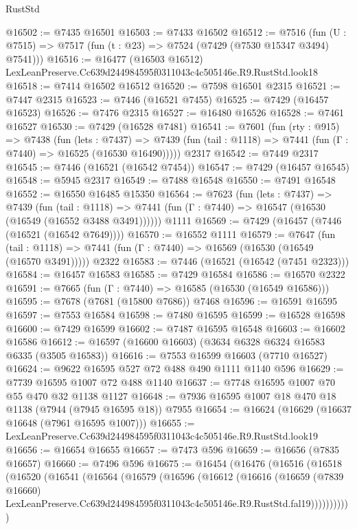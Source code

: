 \begin{lexlean}{RustStd}
\begin{coremodule}
@16502 := @7435 @16501
@16503 := @7433 @16502
@16512 := @7516
    (fun (U : @7515) => @7517 (fun (t : @23) => @7524 (@7429 (@7530 @15347 @3494) @7541)))
@16516 := @16477 (@16503 @16512) LexLeanPreserve.Cc639d244984595f0311043c4c505146e.R9.RustStd.look18
@16518 := @7414 @16502 @16512
@16520 := @7598 @16501 @2315
@16521 := @7447 @2315
@16523 := @7446 (@16521 @7455)
@16525 := @7429 (@16457 @16523)
@16526 := @7476 @2315
@16527 := @16480 @16526
@16528 := @7461 @16527
@16530 := @7429 (@16528 @7481)
@16541 := @7601
    (fun (rty : @915) =>
    @7438
      (fun (lets : @7437) =>
      @7439 (fun (tail : @1118) => @7441 (fun (Γ : @7440) => @16525 (@16530 @16490)))))
    @2317
@16542 := @7449 @2317
@16545 := @7446 (@16521 (@16542 @7454))
@16547 := @7429 (@16457 @16545)
@16548 := @5945 @2317
@16549 := @7488 @16548
@16550 := @7491 @16548
@16552 := @16550 @16485 @15350
@16564 := @7623
    (fun (lets : @7437) =>
    @7439
      (fun (tail : @1118) =>
      @7441 (fun (Γ : @7440) => @16547 (@16530 (@16549 (@16552 @3488 @3491))))))
    @1111
@16569 := @7429 (@16457 (@7446 (@16521 (@16542 @7649))))
@16570 := @16552 @1111
@16579 := @7647
    (fun (tail : @1118) => @7441 (fun (Γ : @7440) => @16569 (@16530 (@16549 (@16570 @3491)))))
    @2322
@16583 := @7446 (@16521 (@16542 (@7451 @2323)))
@16584 := @16457 @16583
@16585 := @7429 @16584
@16586 := @16570 @2322
@16591 := @7665 (fun (Γ : @7440) => @16585 (@16530 (@16549 @16586)))
@16595 := @7678 (@7681 (@15800 @7686)) @7468
@16596 := @16591 @16595
@16597 := @7553 @16584
@16598 := @7480 @16595
@16599 := @16528 @16598
@16600 := @7429 @16599
@16602 := @7487 @16595 @16548
@16603 := @16602 @16586
@16612 := @16597 (@16600 @16603) (@3634 @6328 @6324 @16583 @6335 (@3505 @16583))
@16616 := @7553 @16599 @16603 (@7710 @16527)
@16624 := @9622 @16595 @527 @72 @488 @490 @1111 @1140 @596
@16629 := @7739 @16595 @1007 @72 @488 @1140
@16637 := @7748 @16595 @1007 @70 @55 @470 @32 @1138 @1127
@16648 := @7936 @16595 @1007 @18 @470 @18 @1138 (@7944 (@7945 @16595 @18)) @7955
@16654 := @16624 (@16629 (@16637 @16648 (@7961 @16595 @1007)))
@16655 := LexLeanPreserve.Cc639d244984595f0311043c4c505146e.R9.RustStd.look19
@16656 := @16654 @16655
@16657 := @7473 @596
@16659 := @16656 (@7835 @16657)
@16660 := @7496 @596
@16675 := @16454
    (@16476
      (@16516
        (@16518
          (@16520
            (@16541
              (@16564
                (@16579
                  (@16596
                    (@16612
                      (@16616
                        (@16659
                          (@7839 @16660)
                          LexLeanPreserve.Cc639d244984595f0311043c4c505146e.R9.RustStd.fal19)))))))))))

\end{coremodule}
\end{lexlean}
